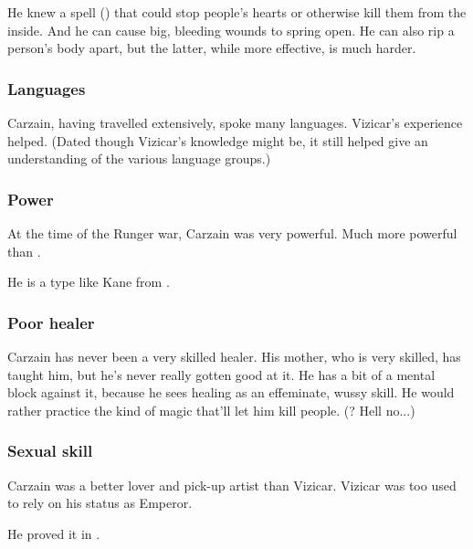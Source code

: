 He knew a spell (\qliphah) that could stop people's hearts or otherwise kill them from the inside. 
And he can cause big, bleeding wounds to spring open. 
He can also rip a person's body apart, but the latter, while more effective, is much harder. 





\subsubsection{Languages}
Carzain, having travelled extensively, spoke many languages. 
Vizicar's experience helped. 
(Dated though Vizicar's knowledge might be, it still helped give an understanding of the various language groups.)





\subsubsection{Power}
At the time of the Runger war, Carzain was very powerful. 
Much more powerful than . 

He is a type like Kane from \cite{KarlEdwardWagner:Kane}. 





\subsubsection{Poor healer}
Carzain has never been a very skilled healer. 
His mother, who is very skilled, has taught him, but he's never really gotten good at it. 
He has a bit of a mental block against it, because he sees healing as an effeminate, wussy skill. 
He would rather practice the kind of magic that'll let him kill people. 
(? Hell no...)




\subsubsection{Sexual skill}
Carzain was a better lover and pick-up artist than Vizicar. 
Vizicar was too used to rely on his status as Emperor. 

He proved it in . 

